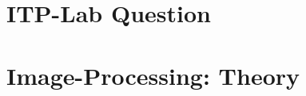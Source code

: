 \documentclass[journal]{IEEEtran}
\begin{document}

\onecolumn
\tableofcontents
\newpage


\section{ITP-Lab Question}


\appendices
\section{Image-Processing: Theory}
\label{app:image-processing}


\clearpage

\end{document}
